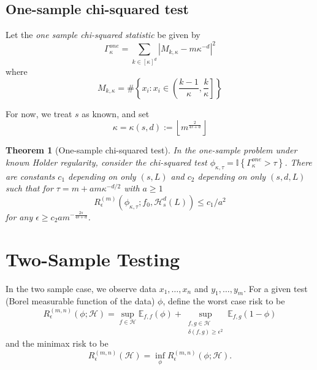 \documentclass{article}
\newcommand{\abs}[1]{\left \lvert #1 \right \rvert}
\newcommand{\set}[1]{\left\{#1\right\}}
\newcommand{\floor}[1]{\left\lfloor #1 \right\rfloor}
\newcommand{\1}{\mathbb{I}}
\newcommand{\Hclass}{\mathcal{H}}
\newcommand{\Ebb}{\mathbb{E}}
\theoremstyle{alden}
\theoremstyle{aldenthm}
\newtheorem{theorem}{Theorem}
\theoremstyle{definition}
\theoremstyle{remark}
\begin{document}
\subsection{One-sample chi-squared test}

Let the \emph{one sample chi-squared statistic} be given by
\begin{equation*}
\Gamma_{\kappa}^{one} = \sum_{k \in [\kappa]^d} \abs{M_{k,\kappa} - m\kappa^{-d}}^2
\end{equation*}
where
\begin{equation*}
M_{k,\kappa} = \# \set{x_i: x_i \in \left(\frac{k-1}{\kappa}, \frac{k}{\kappa}\right]}
\end{equation*}

For now, we treat $s$ as known, and set
\begin{equation*}
\kappa = \kappa(s,d) := \floor{m^{\frac{2}{4s+d}}}
\end{equation*}

\begin{theorem}[One-sample chi-squared test]
	\label{thm:one_sample_chi_squared_test}
	In the one-sample problem under known Holder regularity, consider the chi-squared test $\phi_{\kappa,\tau} = \1\left\{\Gamma_{\kappa}^{one} > \tau \right\}$. There are constants $c_1$ depending on only $(s,L)$ and $c_2$ depending on only $(s,d,L)$ such that for $\tau = m + a m \kappa^{-d/2}$ with $a \geq 1$
	\begin{equation*}
	R_{\epsilon}^{(m)}(\phi_{\kappa,\tau}; f_0, \mathcal{H}_s^d(L)) \leq c_1/a^2
	\end{equation*}
	for any $\epsilon \geq c_2 a m^{-\frac{2s}{4s+d}}$.
\end{theorem}

\section{Two-Sample Testing}
In the two sample case, we observe data $x_1, \ldots, x_n$ and $y_1, \ldots, y_m$. For a given test (Borel measurable function of the data) $\phi$, define the worst case risk to be
\begin{equation*}
R_{\epsilon}^{(m,n)}(\phi; \mathcal{H}) = \sup_{f \in \Hclass} \Ebb_{f,f}(\phi) + \sup_{ \substack{f,g \in \Hclass \\ \delta(f,g) \geq \epsilon^2} } \Ebb_{f,g}(1 - \phi)
\end{equation*}
and the minimax risk to be
\begin{equation*}
R_{\epsilon}^{(m,n)}(\Hclass) = \inf_{\phi} R_{\epsilon}^{(m,n)}(\phi; \mathcal{H}).
\end{equation*}
\end{document}
